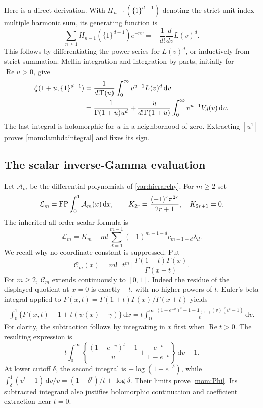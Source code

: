 \documentclass[11pt,letterpaper]{article}
\numberwithin{equation}{section}
\theoremstyle{plain}
\theoremstyle{definition}
\theoremstyle{remark}
\newcommand{\dd}{\,\mathrm d}\newcommand{\iu}{\mathrm i}
\newcommand{\Acal}{\mathcal A}\newcommand{\cA}{\mathcal A}
\newcommand{\re}{\operatorname{Re}}\newcommand{\im}{\operatorname{Im}}
\begin{document}
Here is a direct derivation. With $H_{n-1}(\{1\}^{d-1})$ denoting
the strict unit-index multiple harmonic sum, its generating function
is
\[
 \sum_{n\ge1}H_{n-1}(\{1\}^{d-1})e^{-nv}
 =-\frac1{d!}\frac{d}{dv}L(v)^d.
\]
This follows by differentiating the power series for $L(v)^d$,
or inductively from strict summation. Mellin integration and
integration by parts, initially for $\re u>0$, give
\begin{align}\label{mom:heightmellin}
 \zeta(1+u,\{1\}^{d-1})
 &=\frac1{d!\Gamma(u)}\int_0^\infty v^{u-1}L(v)^d\dd v\notag\\
 &=\frac1{\Gamma(1+u)u^d}
   +\frac{u}{d!\Gamma(1+u)}
          \int_0^\infty v^{u-1}V_d(v)\dd v.
\end{align}
The last integral is holomorphic for $u$ in a neighborhood of zero.
Extracting $[u^1]$ proves \eqref{mom:lambdaintegral} and fixes its sign.

\subsection{The scalar inverse-Gamma evaluation}

Let $\Acal_m$ be the differential polynomials of
\eqref{var:hierarchy}. For $m\ge2$ set
\[
 \mathcal L_m=\FP\int_0^1\Acal_m(x)\dd x,
 \qquad K_{2r}=\frac{(-1)^r\pi^{2r}}{2r+1},\quad K_{2r+1}=0.
\]
The inherited all-order scalar formula is
\begin{equation}\label{mom:scalar}
 \boxed{\displaystyle
 \mathcal L_m=K_m-m!\sum_{d=1}^{m-1}
                (-1)^{m-1-d}c_{m-1-d}\lambda_d.}
\end{equation}
We recall why no coordinate constant is suppressed. Put
\[
 \mathcal C_m(x)=m![t^m]
                  \frac{\Gamma(1-t)\Gamma(x)}{\Gamma(x-t)}.
\]
For $m\ge2$, $\mathcal C_m$ extends continuously to $[0,1]$.
Indeed the residue of the displayed quotient at $x=0$ is exactly
$-t$, with no higher powers of $t$. Euler's beta integral applied to
$F(x,t)=\Gamma(1+t)\Gamma(x)/\Gamma(x+t)$ yields
\begin{align}\label{mom:Phi}
 \int_0^1\{F(x,t)-1+t(\psi(x)+\gamma)\}\dd x
 =t\int_0^\infty
 \frac{(1-e^{-v})^t-1
       -\boldsymbol1_{(0,1)}(v)(v^t-1)}v\dd v.
\end{align}
For clarity, the subtraction follows by integrating in $x$ first
when $\re t>0$. The resulting expression is
\[
 t\int_0^\infty
 \left\{\frac{(1-e^{-v})^t-1}{v}
             +\frac{e^{-v}}{1-e^{-v}}\right\}\dd v-1.
\]
At lower cutoff $\delta$, the second integral is
$-\log(1-e^{-\delta})$, while
$\int_\delta^1(v^t-1)\dd v/v=(1-\delta^t)/t+\log\delta$.
Their limits prove \eqref{mom:Phi}. Its subtracted integrand also
justifies holomorphic continuation and coefficient extraction near
$t=0$.
\end{document}
